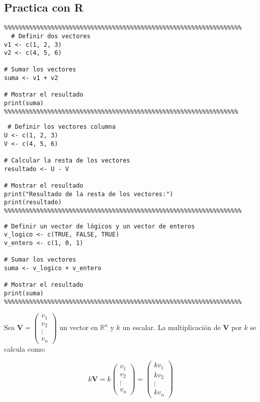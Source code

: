 \subsection{Practica con R}
\begin{verbatim}
%%%%%%%%%%%%%%%%%%%%%%%%%%%%%%%%%%%%%%%%%%%%%%%%%%%%%%%%%%%%%%%%%%
  # Definir dos vectores
v1 <- c(1, 2, 3)
v2 <- c(4, 5, 6)

# Sumar los vectores
suma <- v1 + v2

# Mostrar el resultado
print(suma)  
%%%%%%%%%%%%%%%%%%%%%%%%%%%%%%%%%%%%%%%%%%%%%%%%%%%%%%%%%%%%%%%%%
\end{verbatim}
\begin{verbatim}
 # Definir los vectores columna
U <- c(1, 2, 3)
V <- c(4, 5, 6)

# Calcular la resta de los vectores
resultado <- U - V

# Mostrar el resultado
print("Resultado de la resta de los vectores:")
print(resultado)  
%%%%%%%%%%%%%%%%%%%%%%%%%%%%%%%%%%%%%%%%%%%%%%%%%%%%%%%%%%%%%%%%%%
\end{verbatim}
\begin{verbatim}
# Definir un vector de lógicos y un vector de enteros
v_logico <- c(TRUE, FALSE, TRUE)
v_entero <- c(1, 0, 1)

# Sumar los vectores
suma <- v_logico + v_entero

# Mostrar el resultado
print(suma)
%%%%%%%%%%%%%%%%%%%%%%%%%%%%%%%%%%%%%%%%%%%%%%%%%%%%%%%%%%%%%%%%%%
\end{verbatim}
\begin{definition}
Sea \( \mathbf{V} = \begin{pmatrix} v_1 \\ v_2 \\ \vdots \\ v_n \end{pmatrix} \) un vector en \( \mathbb{R}^n \) y \( k \) un escalar. La multiplicación de \( \mathbf{V} \) por \( k \) se calcula como:

\[
k \boldsymbol{V} = k \begin{pmatrix} v_1 \\ v_2 \\ \vdots \\ v_n \end{pmatrix} = \begin{pmatrix} k v_1 \\ k v_2 \\ \vdots \\ k v_n \end{pmatrix}
\]
\end{definition}
